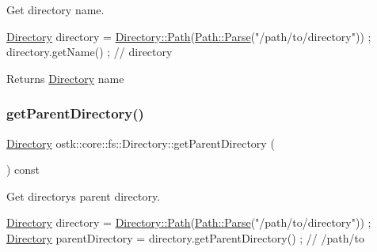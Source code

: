 Get directory name. 


\begin{DoxyCode}
\hyperlink{classostk_1_1core_1_1fs_1_1_directory_adc893e10f55282be0d0455e9cfc5796b}{Directory} directory = \hyperlink{classostk_1_1core_1_1fs_1_1_directory_a0151dba2940d5f426b52209dc7dab2e5}{Directory::Path}(\hyperlink{classostk_1_1core_1_1fs_1_1_path_ad08539ba654f5df11c4bcb07276345ad}{Path::Parse}(\textcolor{stringliteral}{"/path/to/directory"}))
       ;
directory.getName() ; \textcolor{comment}{// directory}
\end{DoxyCode}


\begin{DoxyReturn}{Returns}
\hyperlink{classostk_1_1core_1_1fs_1_1_directory}{Directory} name 
\end{DoxyReturn}
\mbox{\label{classostk_1_1core_1_1fs_1_1_directory_afe68c26e4ef0ce175220a02b14ee3932}} 
\subsubsection{\texorpdfstring{get\+Parent\+Directory()}{getParentDirectory()}}
{\footnotesize\ttfamily \hyperlink{classostk_1_1core_1_1fs_1_1_directory}{Directory} ostk\+::core\+::fs\+::\+Directory\+::get\+Parent\+Directory (\begin{DoxyParamCaption}{ }\end{DoxyParamCaption}) const}



Get directory\textquotesingle{}s parent directory. 


\begin{DoxyCode}
\hyperlink{classostk_1_1core_1_1fs_1_1_directory_adc893e10f55282be0d0455e9cfc5796b}{Directory} directory = \hyperlink{classostk_1_1core_1_1fs_1_1_directory_a0151dba2940d5f426b52209dc7dab2e5}{Directory::Path}(\hyperlink{classostk_1_1core_1_1fs_1_1_path_ad08539ba654f5df11c4bcb07276345ad}{Path::Parse}(\textcolor{stringliteral}{"/path/to/directory"}))
       ;
\hyperlink{classostk_1_1core_1_1fs_1_1_directory_adc893e10f55282be0d0455e9cfc5796b}{Directory} parentDirectory = directory.getParentDirectory() ; \textcolor{comment}{// /path/to}
\end{DoxyCode}


